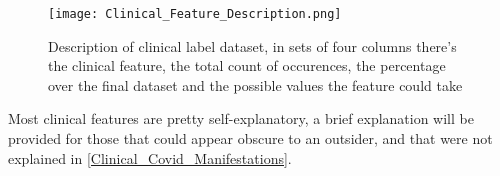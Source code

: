 \begin{figure}[H]
  		\texttt{[image: Clinical\_Feature\_Description.png]}
        \caption{Description of clinical label dataset, in sets of four columns there's the clinical feature, the total count of occurences, the percentage over the final dataset and the possible values the feature could take \label{fig:ClinicalFeatures}}
\end{figure}

Most clinical features are pretty self-explanatory, a brief explanation will be provided for those that could appear obscure to an outsider, and that were not explained in \ref{Clinical_Covid_Manifestations}.

